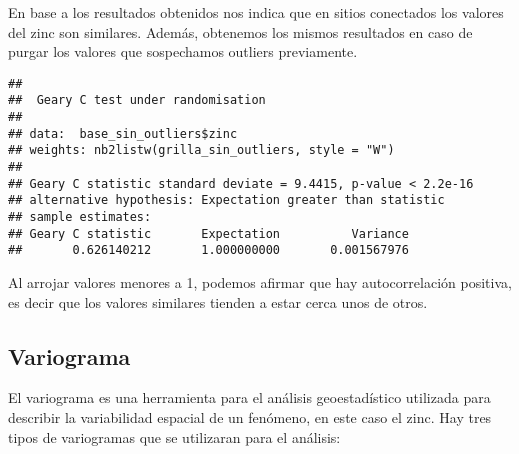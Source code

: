 \documentclass[
  12pt,
]{article}
\newenvironment{Shaded}{\begin{snugshade}}{\end{snugshade}}
\newcommand{\AttributeTok}[1]{\textcolor[rgb]{0.77,0.63,0.00}{#1}}
\newcommand{\CommentTok}[1]{\textcolor[rgb]{0.56,0.35,0.01}{\textit{#1}}}
\newcommand{\ConstantTok}[1]{\textcolor[rgb]{0.00,0.00,0.00}{#1}}
\newcommand{\FunctionTok}[1]{\textcolor[rgb]{0.00,0.00,0.00}{#1}}
\newcommand{\NormalTok}[1]{#1}
\newcommand{\SpecialCharTok}[1]{\textcolor[rgb]{0.00,0.00,0.00}{#1}}
\newcommand{\StringTok}[1]{\textcolor[rgb]{0.31,0.60,0.02}{#1}}
\begin{document}
\begin{Shaded}
\end{Shaded}

En base a los resultados obtenidos nos indica que en sitios conectados
los valores del zinc son similares. Además, obtenemos los mismos
resultados en caso de purgar los valores que sospechamos outliers
previamente.

\begin{Shaded}
\end{Shaded}

\begin{verbatim}
## 
##  Geary C test under randomisation
## 
## data:  base_sin_outliers$zinc 
## weights: nb2listw(grilla_sin_outliers, style = "W") 
## 
## Geary C statistic standard deviate = 9.4415, p-value < 2.2e-16
## alternative hypothesis: Expectation greater than statistic
## sample estimates:
## Geary C statistic       Expectation          Variance 
##       0.626140212       1.000000000       0.001567976
\end{verbatim}

Al arrojar valores menores a 1, podemos afirmar que hay autocorrelación
positiva, es decir que los valores similares tienden a estar cerca unos
de otros.

\hypertarget{variograma}{%
\subsection{Variograma}\label{variograma}}

El variograma es una herramienta para el análisis geoestadístico
utilizada para describir la variabilidad espacial de un fenómeno, en
este caso el zinc. Hay tres tipos de variogramas que se utilizaran para
el análisis:
\end{document}
